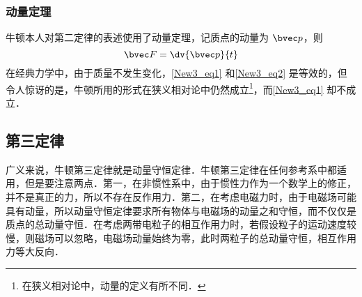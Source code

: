 \subsubsection{动量定理}
牛顿本人对第二定律的表述使用了动量定理，记质点的动量为 $\bvec p$，则
\begin{equation}\label{New3_eq2}
\bvec F = \dv{\bvec p}{t}
\end{equation}
在经典力学中，由于质量不发生变化，\autoref{New3_eq1} 和\autoref{New3_eq2} 是等效的，但令人惊讶的是，牛顿所用的形式在狭义相对论中仍然成立\footnote{在狭义相对论中，动量的定义有所不同．}，而\autoref{New3_eq1} 却不成立．

\subsection{第三定律}
广义来说，牛顿第三定律就是动量守恒定律．牛顿第三定律在任何参考系中都适用，但是要注意两点．第一，在非惯性系中，由于惯性力作为一个数学上的修正，并不是真正的力，所以不存在反作用力．第二，在考虑电磁力时，由于电磁场可能具有动量，所以动量守恒定律要求所有物体与电磁场的动量之和守恒，而不仅仅是质点的总动量守恒．在考虑两带电粒子的相互作用力时，若假设粒子的运动速度较慢，则磁场可以忽略，电磁场动量始终为零，此时两粒子的总动量守恒，相互作用力等大反向．
